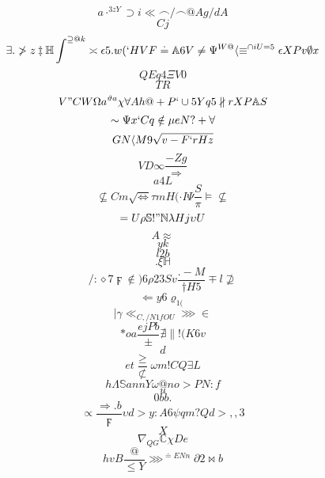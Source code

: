 \documentclass[12pt]{article}
\begin{document}
        \begin{minipage}[t][0pt]{\linewidth}

        \[a\cdot^{3zY}\supset i\ll\frown /\frown @ A g / d A\]
\[Cj\]
\[\exists .\ngtr z\ddagger\mathbb{H}\int^{\supseteq @ k}\asymp\epsilon 5 . w ( ` H V F\doteq\mathbb{A} 6 V\neq\Psi^{W@}\langle\equiv^{\cap i U = 5}\epsilon X P v\emptyset {x}\]
\[QEq4\Xi V 0\]
\[TR\]
\[V"CW\Omega a^{\vartheta a}\chi\forall A h @ + P `\cup 5 Y q 5\nparallel r X P\mathbb{A} S\]
\[\sim\Psi x ` C q\notin\mu e N ? +\forall\]
\[GN\langle M 9\sqrt{v-F`rHz}\]
\[VD\infty\frac{-Zg}{\Longrightarrow}\]
\[a4L\]
\[\nsubseteq C m\sqrt{\iff}\tau m H (\cdot I\Psi\frac{S}{\pi}\models\nsubseteq\]
\[=U\rho\mathbb{S} ! "\mathbb{N}\lambda H j\upsilon U\]
\[A\approx\]
\[yk\]
\[l2b\]
\[.\xi\mathbb{H}\]
\[/:\diamond 7\digamma\notin ) 6\rho 2 3 S v\frac{.-M}{\dagger H 5}\mp l\nsupseteq\]
\[\Leftarrow y 6\varrho_{1(}\]
\[\mid\gamma\ll_{C,/N1fOU}\ggg\in\]
\[*oa\frac{ejPb}{\pm}\nexists\parallel ! ( K 6 v\]
\[d\]
\[et\frac{\geq}{\not\subset}\omega m ! C Q\exists L\]
\[h\Lambda\mathbb{S} a n n Y\omega @ n o > P N : f\]
\[u\]
\[0bb.\]
\[\propto\frac{\Rightarrow . b}{\digamma}\upsilon d > y : A 6\psi q m ? Q d > , , 3\]
\[X\]
\[\nabla_{QG}\mathbb{C}\chi D e\]
\[hvB\frac{@}{\leq Y}\ggg^{\doteq E N n}\partial 2\bowtie b
        \]
\end{minipage}
\end{document}

